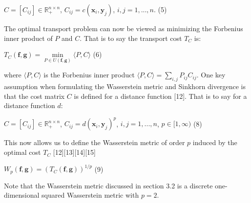 \documentclass[botnum, fleqn]{unmeethesis}
\begin{document}
\hspace{\fill}$C=[C_{ij}]\in\mathbb{R}_+^{n\times n}$, \hspace{0.5cm}$C_{ij}=c(\bm{x}_i,\bm{y}_j)$,\hspace{0.5cm} $i,j=1,...,n$.\hspace{\fill} \normalsize (5)

The optimal transport problem can now be viewed as minimizing the Forbenius inner product of $P$ and $C$. That is to say the transport cost $T_C$ is:

\hspace{\fill}$T_C(\bm{f},\bm{g})=\min\limits_{P\in U(\bm{f},\bm{g})}\langle P,C \rangle$\hspace{\fill} \normalsize (6)

where $\langle P,C \rangle$ is the Forbenius inner product $\langle P,C \rangle=\sum_{i,j}P_{ij}C_{ij}$. One key assumption when formulating the Wasserstein metric and Sinkhorn divergence is that the cost matrix $C$ is defined for a distance function [12]. That is to say for a distance function $d$: 


\hspace{\fill}$C=[C_{ij}]\in \mathbb{R}_+^{n\times n}$, \hspace{0.5cm} $C_{ij}=d(\bm{x}_i,\bm{y}_j)^p$, \hspace{0.5cm} $i,j=1,...,n$, $p\in [1,\infty)$\hspace{\fill} \normalsize (8)

This now allows us to define the Wasserstein metric of order $p$ induced by the optimal cost $T_C$ [12][13][14][15]

\hspace{\fill}$W_p(\bm{f},\bm{g})=(T_C(\bm{f},\bm{g}))^{1/p}$\hspace{\fill} \normalsize (9)

Note that the Wasserstein metric discussed in section 3.2 is a discrete one-dimensional squared Wasserstein metric with $p=2$.
\end{document}
